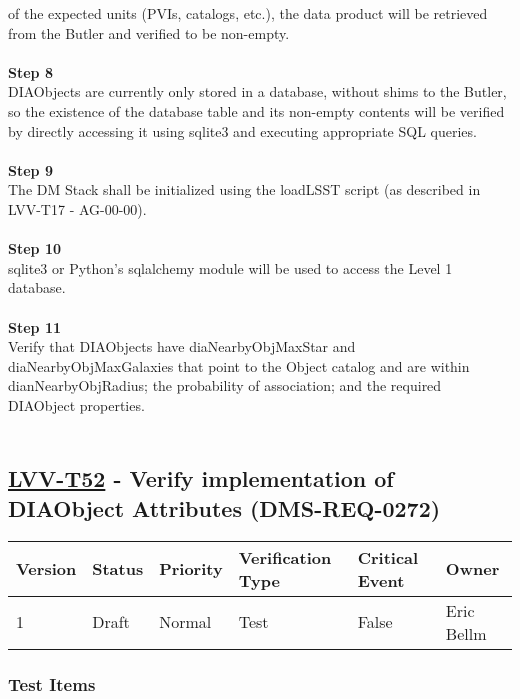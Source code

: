 of the expected units (PVIs, catalogs, etc.), the data product will be
retrieved from the Butler and verified to be non-empty.\\
~\\
\textbf{Step 8}\\
DIAObjects are currently only stored in a database, without shims to the
Butler, so the existence of the database table and its non-empty
contents will be verified by directly accessing it using sqlite3 and
executing appropriate SQL queries.\\
~\\
\textbf{Step 9}\\
The DM Stack shall be initialized using the loadLSST script (as
described in LVV-T17 - AG-00-00).\\
~\\
\textbf{Step 10}\\
sqlite3 or Python's sqlalchemy module will be used to access the Level 1
database.\\
~\\
\textbf{Step 11}\\
Verify that DIAObjects have diaNearbyObjMaxStar and
diaNearbyObjMaxGalaxies that point to the Object catalog and are within
dianNearbyObjRadius; the probability of association; and the required
DIAObject properties.\\
~\\

\hypertarget{lvv-t52---verify-implementation-of-diaobject-attributes-dms-req-0272}{%
\subsection{\texorpdfstring{\href{https://jira.lsstcorp.org/secure/Tests.jspa\#/testCase/LVV-T52}{LVV-T52}
- Verify implementation of DIAObject Attributes
(DMS-REQ-0272)}{LVV-T52 - Verify implementation of DIAObject Attributes (DMS-REQ-0272)}}\label{lvv-t52---verify-implementation-of-diaobject-attributes-dms-req-0272}}

\begin{longtable}[]{@{}llllll@{}}
\toprule
Version & Status & Priority & Verification Type & Critical Event &
Owner\tabularnewline
\midrule
\endhead
1 & Draft & Normal & Test & False & Eric Bellm\tabularnewline
\bottomrule
\end{longtable}

\hypertarget{test-items-141}{%
\subsubsection{Test Items}\label{test-items-141}}

